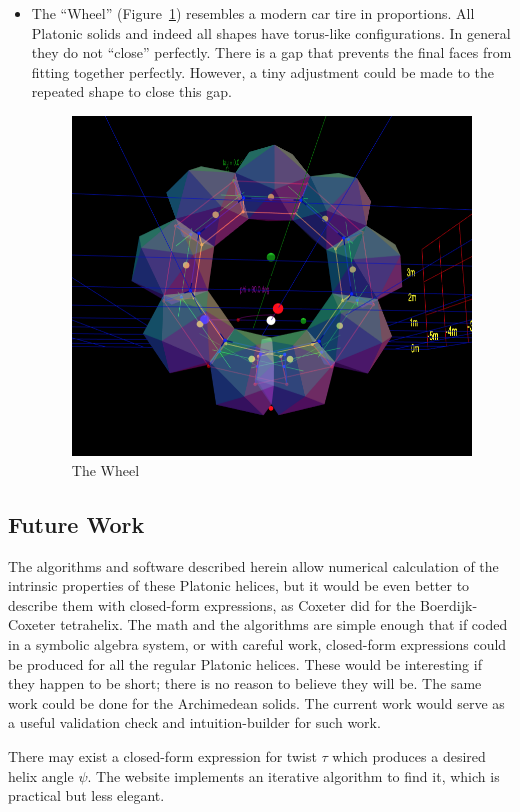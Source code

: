 \documentclass[mathematics,article,submit,pdftex,moreauthors]{Definitions/mdpi}
\begin{document}
\begin{itemize}
\item The ``Wheel'' (Figure~\ref{fig:thewheel}) resembles a modern car tire
  in proportions.
  All Platonic solids and indeed all shapes have torus-like
  configurations. In general they do not ``close'' perfectly. There is a gap that prevents the final faces from fitting together perfectly.
  However, a tiny adjustment could be made to the repeated shape to close this gap.
\begin{figure}
  \centering
  \captionsetup{justification=centering}
     \includegraphics[width=10 cm]{figures/TheWheel.png}
     \caption{The Wheel}
  \label{fig:thewheel}
\end{figure}
\unskip

\end{itemize}

\subsection{Future Work}

The algorithms and software described herein allow numerical calculation of the intrinsic properties of these
Platonic helices, but it would be even better to describe them
with closed-form expressions,
as Coxeter did for the Boerdijk-Coxeter tetrahelix.
The math and the algorithms are simple enough that if coded in a symbolic algebra system,
or with careful work, closed-form
expressions could be produced for all the regular Platonic helices.
These would be interesting if they happen to be short; there is no reason to
believe they will be. The same work could be done for the Archimedean solids. The current work would
serve as a useful validation check and intuition-builder for such work.

There may exist a closed-form expression for twist $\tau$ which produces a desired helix angle $\psi$.
The website implements
an iterative algorithm to find it, which is practical but less elegant.
\end{document}
